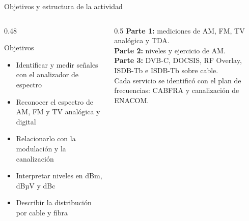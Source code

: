\begin{frame}{Objetivos y estructura de la actividad}
  \begin{columns}[T]
    \begin{column}{0.48\textwidth}
      \begin{block}{Objetivos}
        \small
        \begin{itemize}
          \item Identificar y medir señales con el analizador de espectro
          \item Reconocer el espectro de AM, FM y TV analógica y digital
          \item Relacionarlo con la modulación y la canalización
          \item Interpretar niveles en dBm, dBµV y dBc
          \item Describir la distribución por cable y fibra
        \end{itemize}
      \end{block}
    \end{column}
    \begin{column}{0.5\textwidth}
      \small
      \textbf{Parte 1:} mediciones de AM, FM, TV analógica y TDA.\\[0.2cm]
      \textbf{Parte 2:} niveles y ejercicio de AM.\\[0.2cm]
      \textbf{Parte 3:} DVB-C, DOCSIS, RF Overlay, ISDB-Tb e ISDB-Tb sobre cable.\\[0.3cm]
      Cada servicio se identificó con el plan de frecuencias: CABFRA y canalización de ENACOM.
    \end{column}
  \end{columns}
\end{frame}

